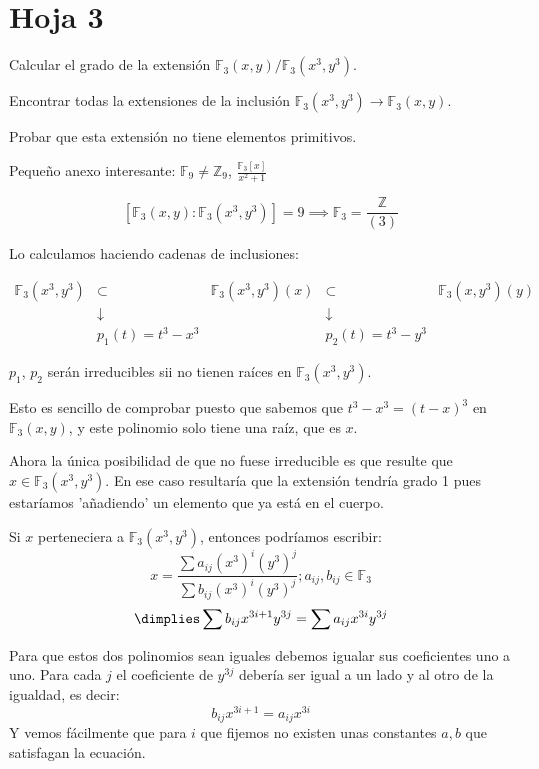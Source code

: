 \section{Hoja 3}

\begin{problem}[3]

\ppart Calcular el grado de la extensión $\mathbb{F}_3(x, y)/\mathbb{F}_3(x^3, y^3)$.

\ppart Encontrar todas la extensiones de la inclusión $\mathbb{F}_3 (x^3 , y^3) → \mathbb{F}_3(x, y)$.

\ppart Probar que esta extensión no tiene elementos primitivos.

\solution

Pequeño anexo interesante: $\mathbb{F}_9 ≠ ℤ_9$, $\frac{\mathbb{F}_3[x]}{x^2+1}$



\spart
$$[\mathbb{F}_3(x,y) : \mathbb{F}_3(x^3,y^3)] = 9 \implies \mathbb{F}_3 = \frac{ℤ}{(3)}$$


Lo calculamos haciendo cadenas de inclusiones:

$$\begin{array}{ccccc}\mathbb{F}_3(x^3,y^3) &\subset& \mathbb{F}_3(x^3,y^3)(x) &\subset& \mathbb{F}_3(x,y^3)(y)\\
&\downarrow& & \downarrow&\\
&p_1(t) = t^3-x^3& & p_2(t) = t^3-y^3&\end{array}$$

$p_1$, $p_2$ serán irreducibles sii no tienen raíces en $\mathbb{F}_3(x^3,y^3)$.

Esto es sencillo de comprobar puesto que sabemos que $t^3-x^3 = (t-x)^3$ en $\mathbb{F}_3(x,y)$, y este polinomio solo tiene una raíz, que es $x$.

Ahora la única posibilidad de que no fuese irreducible es que resulte que $x\in \mathbb{F}_3(x^3,y^3)$. En ese caso resultaría que la extensión tendría grado 1 pues estaríamos 'añadiendo' un elemento que ya está en el cuerpo.

Si $x$ perteneciera a $\mathbb{F}_3(x^3,y^3)$, entonces podríamos escribir:
\[x = \frac{\sum a_{ij}(x^3)^i(y^3)^j}{\sum b_{ij}(x^3)^i(y^3)^j}; a_{ij},b_{ij} ∈ \mathbb{F}_3\]
\[\dimplies \sum b_{ij} x^{3i+1}y^{3j} = \sum a_{ij} x^{3i}y^{3j}\]

Para que estos dos polinomios sean iguales debemos igualar sus coeficientes uno a uno. Para cada $j$ el coeficiente de $y^{3j}$ debería ser igual a un lado y al otro de la igualdad, es decir:
\[b_{ij}x^{3i+1}=a_{ij}x^{3i}\]
Y vemos fácilmente que para $i$ que fijemos no existen unas constantes $a,b$ que satisfagan la ecuación.


\end{problem}

